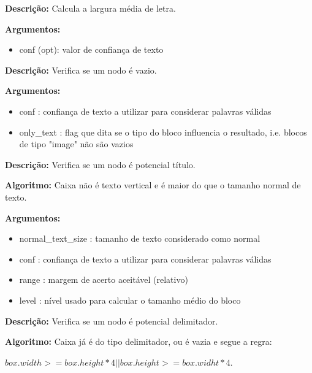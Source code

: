 
\textbf{Descrição:} Calcula a largura média de letra.

\textbf{Argumentos:}
\begin{itemize}\setlength\itemsep{-0.3em}
	\vspace{-0.5em}
	\item conf (opt): valor de confiança de texto 
\end{itemize}




\textbf{Descrição:} Verifica se um nodo é vazio.
	
\textbf{Argumentos:}
\begin{itemize}\setlength\itemsep{-0.3em}
	\vspace{-0.5em}
	\item conf : confiança de texto a utilizar para considerar palavras válidas
	\item only\_text : flag que dita se o tipo do bloco influencia o resultado, i.e. blocos de tipo "image" não são vazios
\end{itemize}

	

\textbf{Descrição:} Verifica se um nodo é potencial título.
	
\textbf{Algoritmo:} Caixa não é texto vertical e é maior do que o tamanho normal de texto.


\textbf{Argumentos:}
\begin{itemize}\setlength\itemsep{-0.3em}
	\vspace{-0.5em}
	\item normal\_text\_size : tamanho de texto considerado como normal
	\item conf : confiança de texto a utilizar para considerar palavras válidas
	\item range : margem de acerto aceitável (relativo)
	\item level : nível usado para calcular o tamanho médio do bloco
\end{itemize}

	

\textbf{Descrição:} Verifica se um nodo é potencial delimitador.
	
\textbf{Algoritmo:} Caixa já é do tipo delimitador, ou é vazia e segue a regra:

$ box.width >= box.height*4 || box.height >= box.widht*4 $.


